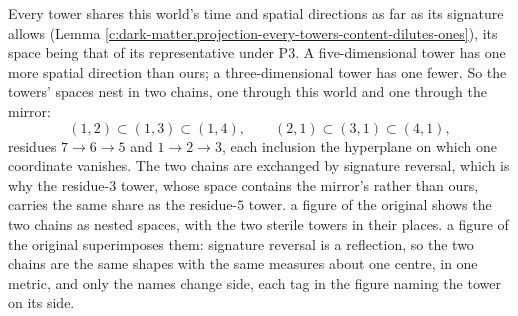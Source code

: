 \documentclass[11pt]{article}
\theoremstyle{definition}
\theoremstyle{plain}
\begin{document}
Every tower shares this world's time and spatial directions as far as its signature allows (Lemma \ref{c:dark-matter.projection-every-towers-content-dilutes-ones}), its space being that of its representative under P3. A five-dimensional tower has one more spatial direction than ours; a three-dimensional tower has one fewer. So the towers' spaces nest in two chains, one through this world and one through the mirror:
\[
(1,2) \subset (1,3) \subset (1,4), \qquad (2,1) \subset (3,1) \subset (4,1),
\]
residues $7 \to 6 \to 5$ and $1 \to 2 \to 3$, each inclusion the hyperplane on which one coordinate vanishes. The two chains are exchanged by signature reversal, which is why the residue-$3$ tower, whose space contains the mirror's rather than ours, carries the same share as the residue-$5$ tower. a figure of the original shows the two chains as nested spaces, with the two sterile towers in their places. a figure of the original superimposes them: signature reversal is a reflection, so the two chains are the same shapes with the same measures about one centre, in one metric, and only the names change side, each tag in the figure naming the tower on its side.
\end{document}
